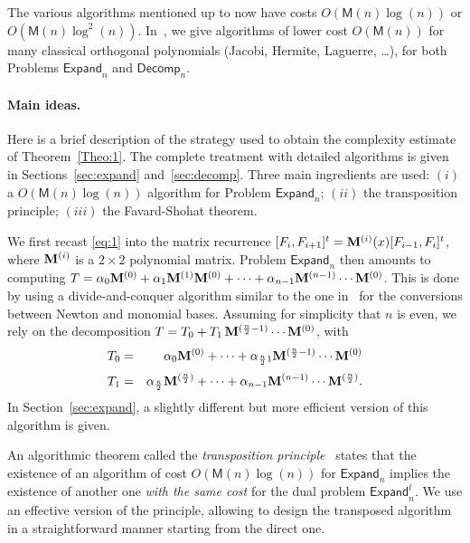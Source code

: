 \documentclass{elsart}
\def\M {\ensuremath{\mathsf{M}}}
\def\E{\textsf{Expand}}
\def\D{\textsf{Decomp}}
\begin{document}
The various algorithms mentioned up to now have costs
$O(\M(n)\log(n))$ or $O(\M(n)\log^2(n))$.  In~\cite{BoSaSc08b}, we
give algorithms of lower cost $O(\M(n))$ for many classical orthogonal
polynomials (Jacobi, Hermite, Laguerre, \dots), for both Problems
$\E_n$ and $\D_n$.



\paragraph*{Main ideas.}
Here is a brief description of the strategy used to obtain the
complexity estimate of Theorem~\ref{Theo:1}. The complete treatment
with detailed algorithms is given in Sections~\ref{sec:expand}
and~\ref{sec:decomp}. Three main ingredients are used: $(i)$ a
$O(\M(n)\log(n))$ algorithm for Problem $\E_n$; $(ii)$ the
transposition principle; $(iii)$ the Favard-Shohat theorem.

We first recast \eqref{eq:1} into the matrix recurrence
$[F_i,F_{i+1}]^t = {\bf M}^{(i)}(x) [F_{i-1},F_{i}]^t$, where ${\bf
M}^{(i)}$ is a $2\times 2$ polynomial matrix. Problem $\E_n$ then
amounts to computing $T=\alpha_0{\bf M}^{(0)} + \alpha_1{\bf M}^{(1)}
{\bf M}^{(0)} + \cdots + \alpha_{n-1} {\bf M}^{(n-1)} \cdots {\bf
M}^{(0)}$.  This is done by using a divide-and-conquer algorithm
similar to the one in~\cite[Th.~2.4]{Gerhard00} for the conversions
between Newton and monomial bases. Assuming for simplicity that $n$ is
even, we rely on the decomposition $T= T_0 + T_1 \, {\bf
M}^{(\frac{n}{2}-1)} \cdots {\bf M}^{(0)}$, with
\begin{eqnarray*}
T_0 &=& \alpha_0{\bf M}^{(0)} + \cdots + \alpha_{\frac{n}{2}
1} {\bf M}^{( \frac{n}{2} -1)} \cdots {\bf
M}^{(0)}\\[1mm] T_1 &=& \alpha_{ \frac{n}{2}}{\bf
M}^{( \frac{n}{2})} + \cdots + \alpha_{n-1} {\bf
M}^{(n-1)} \cdots {\bf M}^{( \frac{n}{2}
)}.\end{eqnarray*} In Section~\ref{sec:expand}, a slightly
different but more efficient version of this algorithm is given.

An algorithmic theorem called the {\it transposition
principle}~\cite[Th.~13.20]{BuClSh97} states that the existence of an
algorithm of cost $O(\M(n)\log(n))$ for $\E_n$ implies the existence
of another one \emph{with the same cost} for the dual problem
$\E^t_n$. We use an effective version of the principle, allowing to
design the transposed algorithm in a straightforward manner starting
from the direct one.
\end{document}
